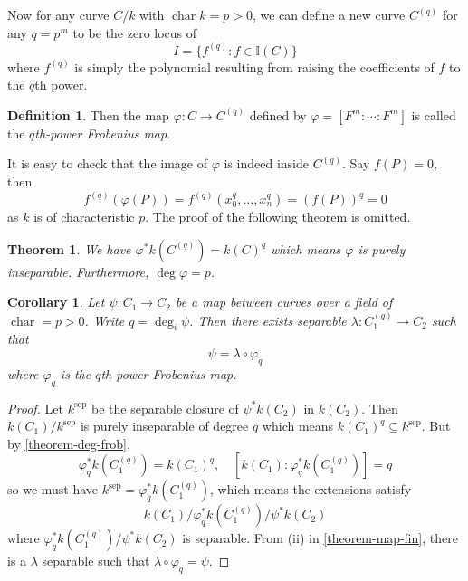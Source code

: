 \documentclass[12pt]{article}
\newtheorem{theorem}{Theorem}[subsection]
\newtheorem{corollary}{Corollary}[subsection]
\theoremstyle{remark}
\theoremstyle{definition}
\newtheorem{definition}{Definition}[subsection]
\begin{document}
        Now for any curve $C/k$ with $\operatorname{char} k=p>0$, we can define a new curve $C^{(q)}$ for any $q=p^m$ to be the zero locus of
        \[I=\{f^{(q)}:f\in\mathbb I(C)\}\]
        where $f^{(q)}$ is simply the polynomial resulting from raising the coefficients of $f$ to the $q$th power.
        \begin{definition}\label{definition-frobenius}
            Then the map $\varphi:C\to C^{(q)}$ defined by $\varphi=[F^m:\cdots:F^m]$ is called the \textit{$q$th-power Frobenius map}.
        \end{definition}
        \noindent It is easy to check that the image of $\varphi$ is indeed inside $C^{(q)}$. Say $f(P)=0$, then 
        \[f^{(q)}(\varphi(P))=f^{(q)}(x_0^q,\dots, x_n^q)=(f(P))^q=0\]
        as $k$ is of characteristic $p$. The proof of the following theorem is omitted.
        \begin{theorem}\label{theorem-deg-frob}
            We have $\varphi^*k(C^{(q)})=k(C)^q$ which means $\varphi$ is purely inseparable. Furthermore, $\deg\varphi=p$.
        \end{theorem}
        \begin{corollary}\label{corollary-frob-decomp}
            Let $\psi:C_1\to C_2$ be a map between curves over a field of $\operatorname{char} =p>0$. Write $q=\deg_i\psi$. Then there exists separable $\lambda:C_1^{(q)}\to C_2$ such that
            \[\psi=\lambda\circ\varphi_q\]
            where $\varphi_q$ is the $q$th power Frobenius map. 
        \end{corollary}
        \begin{proof}
            Let $k^{\text{sep}}$ be the separable closure of $\psi^*k(C_2)$ in $k(C_2)$. Then $k(C_1)/k^{\text{sep}}$ is purely inseparable of degree $q$ which means $k(C_1)^q\subseteq k^{\text{sep}}$. But by \autoref{theorem-deg-frob},
            \[\varphi_q^*k(C_1^{(q)})=k(C_1)^q,\quad [k(C_1):\varphi_q^*k(C_1^{(q)})]=q\]
            so we must have $k^{\text{sep}}=\varphi_q^*k(C_1^{(q)})$, which means the extensions satisfy
            \[k(C_1)/\varphi_q^*k(C_1^{(q)})/\psi^*k(C_2)\]
            where $\varphi_q^*k(C_1^{(q)})/\psi^*k(C_2)$ is separable. From (ii) in \autoref{theorem-map-fin}, there is a $\lambda$ separable such that $\lambda\circ\varphi_q=\psi$.
        \end{proof}
        
        
        
\end{document}
